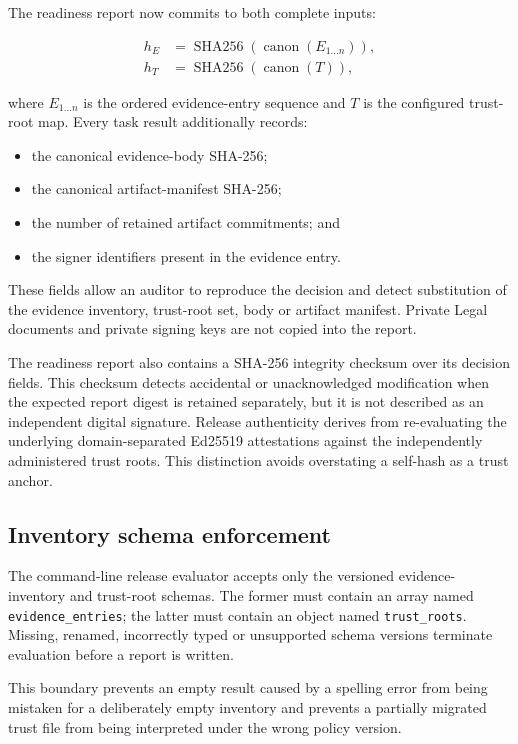 The readiness report now commits to both complete inputs:

\begin{align}
  h_E &= \operatorname{SHA256}(\operatorname{canon}(E_{1\ldots n})), \\
  h_T &= \operatorname{SHA256}(\operatorname{canon}(T)),
\end{align}

where $E_{1\ldots n}$ is the ordered evidence-entry sequence and $T$ is the
configured trust-root map.  Every task result additionally records:

\begin{itemize}
  \item the canonical evidence-body SHA-256;
  \item the canonical artifact-manifest SHA-256;
  \item the number of retained artifact commitments; and
  \item the signer identifiers present in the evidence entry.
\end{itemize}

These fields allow an auditor to reproduce the decision and detect substitution
of the evidence inventory, trust-root set, body or artifact manifest.  Private
Legal documents and private signing keys are not copied into the report.

The readiness report also contains a SHA-256 integrity checksum over its decision
fields.  This checksum detects accidental or unacknowledged modification when the
expected report digest is retained separately, but it is not described as an
independent digital signature.  Release authenticity derives from re-evaluating
the underlying domain-separated Ed25519 attestations against the independently
administered trust roots.  This distinction avoids overstating a self-hash as a
trust anchor.

\subsection{Inventory schema enforcement}

The command-line release evaluator accepts only the versioned evidence-inventory
and trust-root schemas.  The former must contain an array named
\texttt{evidence\_entries}; the latter must contain an object named
\texttt{trust\_roots}.  Missing, renamed, incorrectly typed or unsupported schema
versions terminate evaluation before a report is written.

This boundary prevents an empty result caused by a spelling error from being
mistaken for a deliberately empty inventory and prevents a partially migrated
trust file from being interpreted under the wrong policy version.

